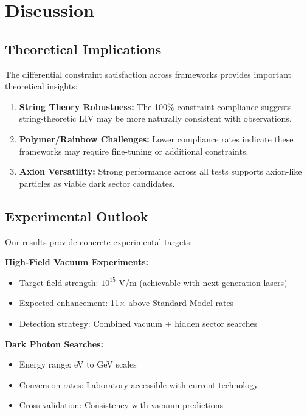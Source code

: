 \documentclass[12pt]{article}
\begin{document}
\section{Discussion}

\subsection{Theoretical Implications}

The differential constraint satisfaction across frameworks provides important theoretical insights:

\begin{enumerate}
\item \textbf{String Theory Robustness:} The 100\% constraint compliance suggests string-theoretic LIV may be more naturally consistent with observations.

\item \textbf{Polymer/Rainbow Challenges:} Lower compliance rates indicate these frameworks may require fine-tuning or additional constraints.

\item \textbf{Axion Versatility:} Strong performance across all tests supports axion-like particles as viable dark sector candidates.
\end{enumerate}

\subsection{Experimental Outlook}

Our results provide concrete experimental targets:

\textbf{High-Field Vacuum Experiments:}
\begin{itemize}
\item Target field strength: $10^{15}$ V/m (achievable with next-generation lasers)
\item Expected enhancement: 11$\times$ above Standard Model rates
\item Detection strategy: Combined vacuum + hidden sector searches
\end{itemize}

\textbf{Dark Photon Searches:}
\begin{itemize}
\item Energy range: eV to GeV scales
\item Conversion rates: Laboratory accessible with current technology
\item Cross-validation: Consistency with vacuum predictions
\end{itemize}
\end{document}
